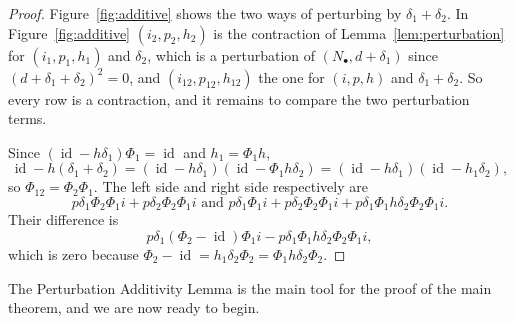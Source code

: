 \documentclass[12pt]{amsart}
\theoremstyle{plain}
\theoremstyle{definition}
\newcommand{\id}{\operatorname{id}}
\begin{document}
\begin{proof}
    Figure~\ref{fig:additive} shows the two ways of perturbing by $\delta_1 + \delta_2$. In Figure~\ref{fig:additive} $(i_2, p_2, h_2)$ is the contraction of Lemma~\ref{lem:perturbation} for $(i_1, p_1, h_1)$ and $\delta_2$, which is a perturbation of $(N_\bullet, d + \delta_1)$ since $(d + \delta_1 + \delta_2)^2 = 0$, and $(i_{12}, p_{12}, h_{12})$ the one for $(i, p, h)$ and $\delta_1 + \delta_2$. So every row is a contraction, and it remains to compare the two perturbation terms.

    Since $(\id - h\delta_1)\Phi_1 = \id$ and $h_1 = \Phi_1 h$,
    \[
        \id - h(\delta_1 + \delta_2) = (\id - h\delta_1)(\id - \Phi_1 h \delta_2) = (\id - h\delta_1)(\id - h_1 \delta_2),
    \]
    so $\Phi_{12} = \Phi_2 \Phi_1$. The left side and right side respectively are
    $$p \delta_1 \Phi_2 \Phi_1 i + p \delta_2 \Phi_2 \Phi_1 i \text{ and }
    p \delta_1 \Phi_1 i + p \delta_2 \Phi_2 \Phi_1 i + p \delta_1 \Phi_1 h \delta_2 \Phi_2 \Phi_1 i.$$ Their difference is
    \[
        p \delta_1 (\Phi_2 - \id) \Phi_1 i - p \delta_1 \Phi_1 h \delta_2 \Phi_2 \Phi_1 i ,
    \]
    which is zero because $\Phi_2 - \id = h_1 \delta_2 \Phi_2 = \Phi_1 h \delta_2 \Phi_2$.
\end{proof}

The Perturbation Additivity Lemma is the main tool for the proof of the main theorem, and we are now ready to begin.
\end{document}
